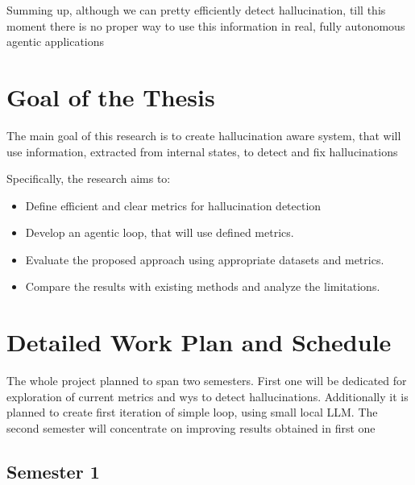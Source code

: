 \documentclass[11pt,a4paper]{article}
\begin{document}
Summing up, although we can pretty efficiently detect
hallucination, till this moment there is no proper way to use
this information in real, fully autonomous agentic applications 


\section{Goal of the Thesis}

The main goal of this research is to create hallucination aware
system, that will use information, extracted from internal states,
to detect and fix hallucinations

Specifically, the research aims to:

\begin{itemize}

    \item Define efficient and clear metrics for hallucination detection

    \item Develop an agentic loop, that will use defined metrics.

    \item Evaluate the proposed approach using appropriate
    datasets and metrics.

    \item Compare the results with existing methods
    and analyze the limitations.

\end{itemize}


\section{Detailed Work Plan and Schedule}

The whole project planned to span two semesters. First one will be
dedicated for exploration of current metrics and wys to detect hallucinations.
Additionally it is planned to create first iteration of simple loop, using
small local LLM. The second semester will concentrate on improving results
obtained in first one

\subsection*{Semester 1}
\end{document}
